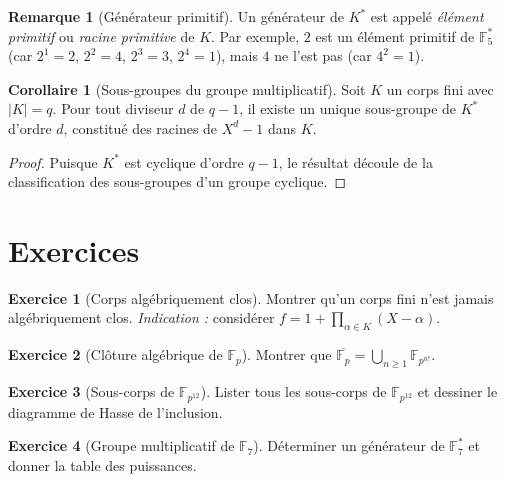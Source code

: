 \documentclass[12pt,a4paper,openany]{book}
\theoremstyle{definition}
\newtheorem{corollaire}{Corollaire}[chapter]
\newtheorem{remarque}{Remarque}[chapter]
\newtheorem{exercice}{Exercice}[chapter]
\newcommand{\F}{\mathbb{F}}
\begin{document}
\begin{remarque}[Générateur primitif]
\label{rem:generateur-primitif}
Un générateur de $K^*$ est appelé \emph{élément primitif}
ou \emph{racine primitive} de $K$. Par exemple, $2$ est un élément primitif de
$\F_5^*$ (car $2^1 = 2$, $2^2 = 4$, $2^3 = 3$, $2^4 = 1$), mais $4$ ne l'est
pas (car $4^2 = 1$).
\end{remarque}

\begin{corollaire}[Sous-groupes du groupe multiplicatif]\label{cor:sous-groupes-mult}
Soit $K$ un corps fini avec $|K| = q$. Pour tout diviseur $d$ de $q - 1$, il
existe un unique sous-groupe de $K^*$ d'ordre $d$, constitué des racines de
$X^d - 1$ dans $K$.
\end{corollaire}

\begin{proof}
Puisque $K^*$ est cyclique d'ordre $q - 1$, le résultat découle de la
classification des sous-groupes d'un groupe cyclique.
\end{proof}

\section{Exercices}
\label{sec:exercices-chap10}

\begin{exercice}[Corps algébriquement clos]\label{exo:alg-clos}
Montrer qu'un corps fini n'est jamais algébriquement clos.
\emph{Indication :} considérer $f = 1 + \prod_{\alpha \in K} (X - \alpha)$.
\end{exercice}

\begin{exercice}[Clôture algébrique de $\F_p$]\label{exo:cloture-Fp}
Montrer que $\overline{\F_p} = \bigcup_{n \geq 1} \F_{p^{n!}}$.
\end{exercice}

\begin{exercice}[Sous-corps de $\F_{p^{12}}$]\label{exo:sous-corps-p12}
Lister tous les sous-corps de $\F_{p^{12}}$ et dessiner le diagramme de Hasse
de l'inclusion.
\end{exercice}

\begin{exercice}[Groupe multiplicatif de $\F_7$]\label{exo:mult-F7}
Déterminer un générateur de $\F_7^*$ et donner la table des puissances.
\end{exercice}
\end{document}
